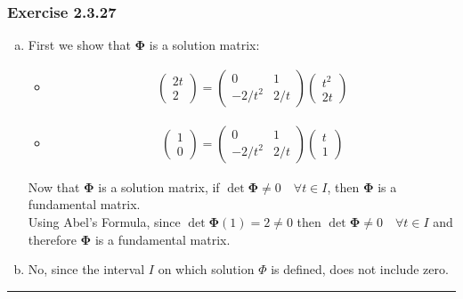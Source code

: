 \documentclass[12pt, letterpaper]{scrartcl}
\begin{document}
\subsubsection*{Exercise 2.3.27}
\begin{enumerate}[(a)]
    \item First we show that $\bm\Phi$ is a solution matrix:
    \begin{itemize}
        \item
        \begin{align*}
            \left( \begin{array}{c} 2t \\ 2  \end{array}\right)=
            \left( \begin{array}{cc} 0 & 1 \\ -2/t^2 & 2/t \end{array}\right)
            \left( \begin{array}{c} t^2  \\ 2t   \end{array}\right)
        \end{align*}
        \item 
        \begin{align*}
            \left( \begin{array}{c} 1 \\ 0  \end{array}\right)=
            \left( \begin{array}{cc}0 & 1 \\ -2/t^2 & 2/t \end{array}\right)
            \left( \begin{array}{c} t  \\ 1   \end{array}\right)
        \end{align*}
    \end{itemize}
    Now that $\bm\Phi$ is a solution matrix, if $\det\bm\Phi\neq0\quad\forall t\in I$, then $\bm\Phi$ is a fundamental matrix.\\
Using Abel's Formula, since $\det\bm\Phi(1)=2\neq 0$ then $\det\bm\Phi\neq0\quad\forall t\in I$ and therefore $\bm\Phi$ is a fundamental matrix.
    \item No, since the interval $I$ on which solution $\Phi$ is defined, does not include zero.
\end{enumerate}
\vskip1mm\hrule
\end{document}
